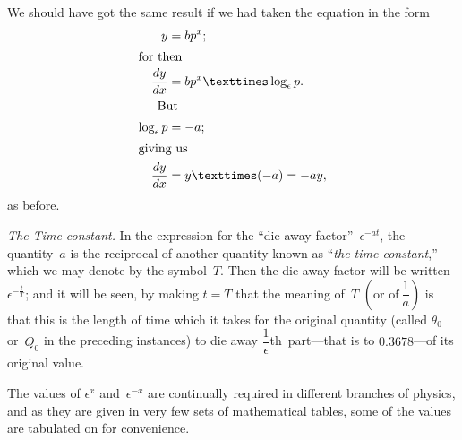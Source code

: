 \documentclass[12pt]{book}[2005/09/16]
\newcommand{\Paragraph}[1]{\medskip\pagebreak[1]\par\textit{#1}}
\newcommand{\DPPageSep}[2]{\Pagelabel{#2}}
\newcommand{\Pagelabel}[1]
  {\phantomsection\label{#1}}
\newcommand{\Pageref}[2][p.]{%
  \ifthenelse{\not\equal{#1}{}}{%
    \hyperref[#2]{#1~\pageref*{#2}}%
  }{%
    \hyperref[#2]{\pageref{*#2}}%
  }%
}
\newcommand{\DPchg}[2]{#2}%
\newcommand{\efrac}[2]{\frac{#1}{#2}}
\begin{document}
We should have got the same result if we had
taken the equation in the form
\begin{align*}
y &= bp^x; \\
\intertext{for then}
\frac{dy}{dx}
  &= bp^x × \log_\epsilon p. \\
\intertext{\indent But}
\log_\epsilon p &= -a; \\
\intertext{giving us}
\frac{dy}{dx} &= y × (-a) = -ay,
\end{align*}
as before.

\Paragraph{The Time-constant.} In the expression for the ``die-away
factor''~$\epsilon^{-at}$, the quantity~$a$ is the reciprocal of
another quantity known as ``\emph{the time-constant},'' which
we may denote by the symbol~$T$. Then the die-away
factor will be written~$\epsilon^{-\efrac{t}{T}}$; and it will be seen, by
making $t = T$ that the meaning of~$T$ $\left(\text{or of}~\dfrac{1}{a}\right)$ is that
this is the length of time which it takes for the original
quantity (called $\theta_0$ or~$Q_0$ in the preceding instances)
to die away $\dfrac{1}{\epsilon}$th~part---that is to $0.3678$---of its
original value.
\DPPageSep{171.png}{159}%

The values of $\epsilon^x$ and~$\epsilon^{-x}$ are continually required
in different branches of physics, and as they are given
in very few sets of mathematical tables, some of the
values are tabulated \DPchg{here}{on \Pageref{littletable}} for convenience.
\end{document}
